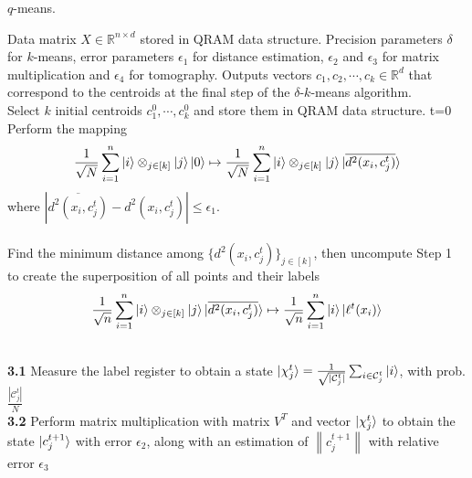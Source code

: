 \documentclass{article}
\newcommand{\errdist}{\epsilon_1}
\newcommand{\errmult}{\epsilon_2}
\newcommand{\errnorms}{\epsilon_3}
\newcommand{\errtom}{\epsilon_4}
\newcommand{\norm}[1]{\left\lVert#1\right\rVert}
\begin{document}
\pagestyle{empty} 

\begin{algorithm} 
	\caption{$q$-means.} 
	\begin{algorithmic}[1]
	 
	\Require  Data matrix $X \in \mathbb{R}^{n \times d}$ stored in QRAM data structure. Precision parameters $\delta$ for $k$-means, error parameters
	$\errdist$ for distance estimation, $\errmult$ and $\errnorms$ for matrix multiplication and $\errtom$ for tomography. 
	\Ensure Outputs vectors $c_{1}, c_{2}, \cdots, c_{k} \in \mathbb{R}^{d}$ that correspond to the centroids at the final step of the $\delta$-$k$-means algorithm.\\
	\vspace{10pt} 
	\Statex Select $k$ initial centroids $c_{1}^{0}, \cdots, c_{k}^{0}$ and store them in QRAM data structure. 
	\State t=0
	\Repeat 
	\\
	Perform the mapping 
	\begin{equation}
	\frac{1}{\sqrt{N}}\sum_{i=1}^{n}   \ket{i} \otimes_{j \in [k]} \ket{j}\ket{0} \mapsto \frac{1}{\sqrt{N}}\sum_{i=1}^{n}  \ket{i} \otimes_{j \in [k]} \ket{j}\ket{\overline{d^2(x_{i}, c_{j}^{t})}}
	\end{equation}
	where $|\overline{d^2(x_{i}, c_{j}^{t})} -  d^2(x_{i}, c_{j}^{t}) | \leq \epsilon_{1}. $\\
	\\
	Find the minimum distance among $\{d^2(x_{i}, c_{j}^{t})\}_{j\in[k]}$, then uncompute Step 1 to create the superposition of all points and their labels
	\begin{equation}
	\frac{1}{\sqrt{n}}\sum_{i=1}^{n}  \ket{i} \otimes_{j \in [k]} \ket{j}\ket{\overline{d^2(x_{i}, c_{j}^{t})}}
	 \mapsto \frac{1}{\sqrt{n}}\sum_{i=1}^{n} \ket{i} \ket{ \ell^t(x_{i})}
	\end{equation} 
	
	 \\
	{\bf 3.1} Measure the label register to obtain a state $\ket{\chi_{j}^t} = \frac{1}{ \sqrt{ |\mathcal{C}^t_{j}|} }  \sum_{i\in \mathcal{C}^t_j}\ket{i}$, with prob. $\frac{|\mathcal{C}^{t}_j|}{N} $ \\ %
	{\bf 3.2} Perform matrix multiplication with matrix $V^T$ and vector  $\ket{\chi_{j}^t}$  to obtain the state $\ket{c_{j}^{t+1}}$ with error $\errmult$, along with an estimation of $\norm{c_{j}^{t+1}}$ with relative error $\errnorms$ \\
	

\end{algorithmic}
\end{algorithm}
\end{document}
